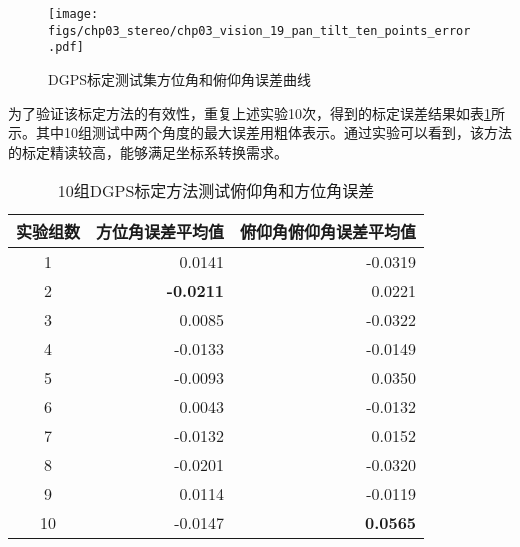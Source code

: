 \begin{figure}[htb]
	\centering
	\texttt{[image: figs/chp03\_stereo/chp03\_vision\_19\_pan\_tilt\_ten\_points\_error.pdf]}	
	\caption{DGPS标定测试集方位角和俯仰角误差曲线}
	\label{fig:chp03_vision_19_pan_tilt_ten_points_error}
\end{figure}

为了验证该标定方法的有效性，重复上述实验10次，得到的标定误差结果如表\ref{label:DGPS_10_Test_Results}所示。其中10组测试中两个角度的最大误差用粗体表示。通过实验可以看到，该方法的标定精读较高，能够满足坐标系转换需求。
\begin{table}[htb]
	\centering
	\caption{10组DGPS标定方法测试俯仰角和方位角误差}
	\label{label:DGPS_10_Test_Results}
	\begin{tabular}{crr}
		\hline
		实验组数 & \multicolumn{1}{c}{方位角误差平均值} & \multicolumn{1}{c}{俯仰角俯仰角误差平均值} \\ \hline
		1    & 0.0141                       & -0.0319                         \\
		2    & \textbf{-0.0211}             & 0.0221                          \\
		3    & 0.0085                       & -0.0322                \\
		4    & -0.0133                      & -0.0149                         \\
		5    & -0.0093                      & 0.0350                          \\
		6    & 0.0043                       & -0.0132                         \\
		7    & -0.0132                      & 0.0152                          \\
		8    & -0.0201                      & -0.0320                         \\
		9    & 0.0114                       & -0.0119                         \\
		10   & -0.0147                      & \textbf{0.0565}                          \\ \hline
	\end{tabular}
\end{table}
